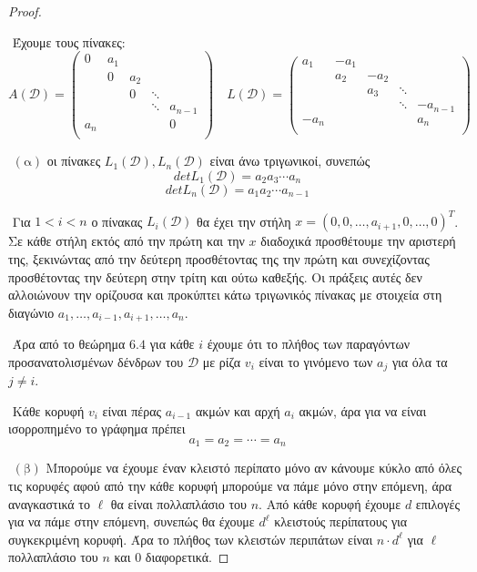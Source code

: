 \documentclass[oneside,a4paper]{article}
\begin{document}
\vspace*{1cm}
\begin{proof} $ $

	
	$ $\newline
	Έχουμε τους πίνακες:
	$$A(\mathcal{D}) = \begin{pmatrix}
		0 & a_1 &  &  &  \\
		 & 0 & a_2 &  &  \\
		 &  & 0 & \ddots &  \\
		 &  &  & \ddots & a_{n-1} \\
		a_n &  &  &  & 0 \\
	\end{pmatrix} \quad L(\mathcal{D}) = \begin{pmatrix}
		a_1 & -a_1 &  &  &  \\
		 & a_2 & -a_2 &  &  \\
		 &  & a_3 & \ddots &  \\
		 &  &  & \ddots & -a_{n-1} \\
		-a_n &  &  &  & a_n \\
	\end{pmatrix}$$

$ $\newline
$(\text{α})$ οι πίνακες $L_1(\mathcal{D}), L_n(\mathcal{D})$ είναι άνω τριγωνικοί, συνεπώς
$$detL_1(\mathcal{D}) = a_2 a_3 \cdots a_n$$
$$detL_n(\mathcal{D}) = a_1 a_2 \cdots a_{n-1}$$

$ $\newline
Για $1<i<n$ ο πίνακας $L_i(\mathcal{D})$ θα έχει την στήλη $  x = (0,0,\ldots, a_{i+1}, 0,\ldots, 0)^T$. Σε κάθε στήλη εκτός από την πρώτη και την $x$ διαδοχικά προσθέτουμε την αριστερή της, ξεκινώντας από την δεύτερη προσθέτοντας της την πρώτη και συνεχίζοντας προσθέτοντας την δεύτερη στην τρίτη και ούτω καθεξής. Οι πράξεις αυτές δεν αλλοιώνουν την ορίζουσα και προκύπτει κάτω τριγωνικός πίνακας με στοιχεία στη διαγώνιο $a_1,\ldots, a_{i-1}, a_{i+1},\ldots,a_n$.

$ $\newline
Άρα από το θεώρημα $6.4$ για κάθε $i$ έχουμε ότι το πλήθος των παραγόντων προσανατολισμένων δένδρων του $\mathcal{D}$ με ρίζα $v_i$ είναι το γινόμενο των $a_j$ για όλα τα $j\neq i$.

$ $\newline
Κάθε κορυφή $v_i$ είναι πέρας $a_{i-1}$ ακμών και αρχή $a_i$ ακμών, άρα για να είναι ισορροπημένο το γράφημα πρέπει
$$a_1 = a_2 = \cdots = a_n$$ 

$ $\newline
$(\text{β})$ Μπορούμε να έχουμε έναν κλειστό περίπατο μόνο αν κάνουμε κύκλο από όλες τις κορυφές αφού από την κάθε κορυφή μπορούμε να πάμε μόνο στην επόμενη, άρα αναγκαστικά το $\ell$ θα είναι πολλαπλάσιο του $n$. Από κάθε κορυφή έχουμε $d$ επιλογές για να πάμε στην επόμενη, συνεπώς θα έχουμε $d^{\ell}$ κλειστούς περίπατους για συγκεκριμένη κορυφή. Άρα το πλήθος των κλειστών περιπάτων είναι $n \cdot d^{\ell}$ για $\ell$ πολλαπλάσιο του $n$ και $0$ διαφορετικά.



\end{proof}
\end{document}
